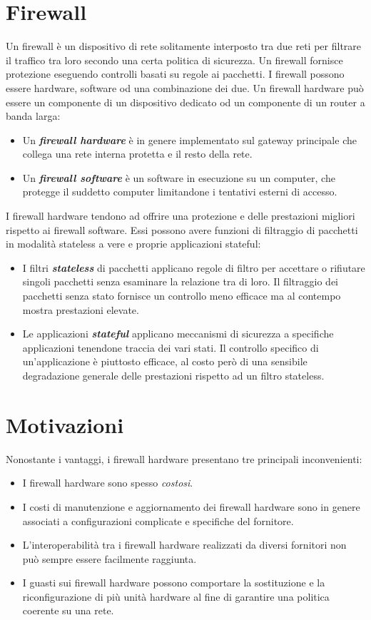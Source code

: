 
\section{Firewall}
Un firewall è un dispositivo di rete solitamente interposto tra due reti per filtrare il traffico tra loro secondo una certa politica di sicurezza. Un firewall fornisce protezione eseguendo controlli basati su regole ai pacchetti. I firewall possono essere hardware, software od una combinazione dei due. Un firewall hardware può essere un componente di un dispositivo dedicato od un componente di un router a banda larga:
\begin{itemize}
  \item Un \textit{\textbf{firewall hardware}} è in genere implementato sul gateway principale che collega una rete interna protetta e il resto della rete.
  \item Un \textit{\textbf{firewall software}} è un software in esecuzione su un computer, che protegge il suddetto computer limitandone i tentativi esterni di accesso.
\end{itemize}

I firewall hardware tendono ad offrire una protezione e delle prestazioni migliori rispetto ai firewall software. Essi possono avere funzioni di filtraggio di pacchetti in modalità stateless a vere e proprie applicazioni stateful:
\begin{itemize}
  \item I filtri \textbf{\textit{stateless}} di pacchetti applicano regole di filtro per accettare o rifiutare singoli pacchetti senza esaminare la relazione tra di loro. Il filtraggio dei pacchetti senza stato fornisce un controllo meno efficace ma al contempo mostra prestazioni elevate.
  \item Le applicazioni \textbf{\textit{stateful}} applicano meccanismi di sicurezza a specifiche applicazioni tenendone traccia dei vari stati. Il controllo specifico di un'applicazione è piuttosto efficace, al costo però di una sensibile degradazione generale delle prestazioni rispetto ad un filtro stateless.
\end{itemize}


\section{Motivazioni}

Nonostante i vantaggi, i firewall hardware presentano tre principali inconvenienti:

\begin{itemize}
  \item I firewall hardware sono spesso \textit{costosi}.
  \item I costi di manutenzione e aggiornamento dei firewall hardware sono in genere associati a configurazioni complicate e specifiche del fornitore.
  \item L'interoperabilità tra i firewall hardware realizzati da diversi fornitori non può sempre essere facilmente raggiunta.
  \item I guasti sui firewall hardware possono comportare la sostituzione e la riconfigurazione di più unità hardware al fine di garantire una politica coerente su una rete.
\end{itemize}

